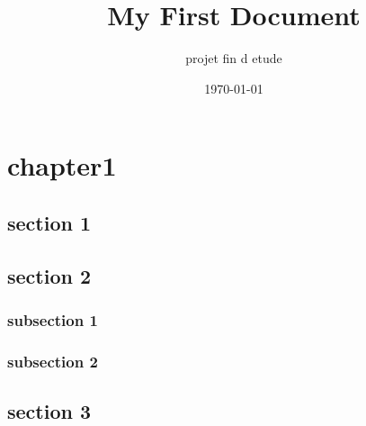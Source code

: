 \documentclass[a4paper,12pt]{book}
\title{My First Document}
\author{projet fin d etude}
\date{\today}
\begin{document}
\chapter{chapter1}
\section{section 1 }
\section{section 2}
\subsection{subsection 1}
\subsection{subsection 2}
\section{section 3}
\end{document}
